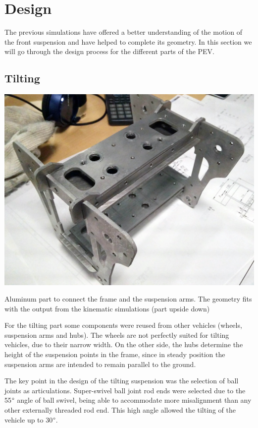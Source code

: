 \newpage
\section{Design}

The previous simulations have offered a better understanding of the motion of the front suspension and have helped to complete its geometry. In this section we will go through the design process for the different parts of the PEV.

\subsection{Tilting}
\begin{marginfigure}[5.5cm]
	\includegraphics[width=1\linewidth]{figs/05/IMG_20161220_154842}
	\caption{Aluminum part to connect the frame and the suspension arms. The geometry fits with the output from the kinematic simulations (part upside down) }
\end{marginfigure}
For the tilting part some components were reused from other vehicles (wheels, suspension arms and hubs). The wheels are not perfectly suited for tilting vehicles, due to their narrow width. On the other side, the hubs determine the height of the suspension points in the frame, since in steady position the suspension arms are intended to remain parallel to the ground. 

The key point in the design of the tilting suspension was the selection of ball joints as articulations. Super-swivel ball joint rod ends were selected due to the 55$\degree$ angle of ball swivel, being able to accommodate more misalignment than any other externally threaded rod end. This high angle allowed the tilting of the vehicle up to 30$\degree$.


